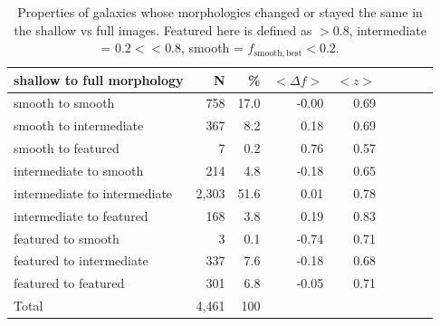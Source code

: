 \documentclass[twocolumn]{aastex6}
\begin{document}
\begin{table}
\caption{Properties of galaxies whose morphologies changed or stayed the same
in the shallow vs full images. Featured here is defined as \fbest$>0.8$,
intermediate = $0.2<$\fbest$<0.8$, smooth = $f_\mathrm{smooth,best}<0.2$.
\label{tbl:shallow_to_full_stats}}
\begin{tabular}{lrrrrrrrr}
\hline\hline
shallow to full morphology    & N       & \%       & $<\Delta f>$ & $<z>$ \\
\hline
smooth to smooth              & 758     & 17.0     & -0.00        &  0.69\\
smooth to intermediate        & 367     & 8.2      & 0.18         &  0.69\\
smooth to featured            & 7       & 0.2      & 0.76         &  0.57\\ 
intermediate to smooth        & 214     & 4.8      & -0.18        &  0.65\\
intermediate to intermediate  & 2,303   & 51.6     & 0.01         &  0.78 \\
intermediate to featured      & 168     & 3.8      & 0.19         &  0.83\\
featured to smooth            & 3       & 0.1      & -0.74        &  0.71\\
featured to intermediate      & 337     & 7.6      & -0.18        &  0.68\\
featured to featured          & 301     & 6.8      & -0.05        &  0.71\\

Total                         & 4,461   & 100      &              & \\
\hline\hline
\end{tabular}
\end{table}
\end{document}
